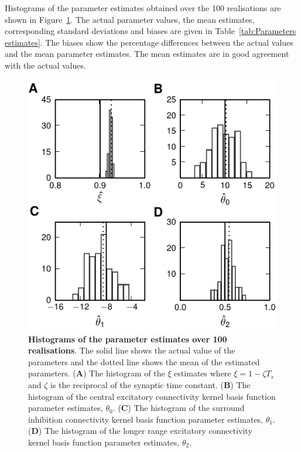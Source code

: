 \documentclass[10pt]{article}
\begin{document}
Histograms of the parameter estimates obtained over the 100 realisations are shown in Figure~\ref{fig:Parameters}. The actual parameter values, the mean estimates, corresponding standard deviations and biases are given in Table~\ref{tab:Parameters estimates}. The biases show the percentage differences between the actual values and the mean parameter estimates. The mean estimates are in good agreement with the actual values.
\begin{figure}
    \centering
    \includegraphics{./Graph/ParametesDistributions.pdf}
  \caption{{\bf Histograms of the parameter estimates over 100
realisations}. The solid line shows the actual value of the parameters and the dotted line shows the mean of the estimated parameters. (\textbf{A}) The histogram of the $\xi$ estimates where $\xi=1-\zeta T_s $ and $\zeta$ is the reciprocal of the synaptic time constant. (\textbf{B}) The histogram of the central excitatory connectivity kernel basis function parameter estimates, $\theta_0$. (\textbf{C}) The histogram of the surround inhibition connectivity kernel basis function parameter estimates, $\theta_1$. (\textbf{D}) The histogram of the longer range excitatory connectivity kernel basis function parameter estimates, $\theta_2$.}
\label{fig:Parameters}
\end{figure}
\end{document}
